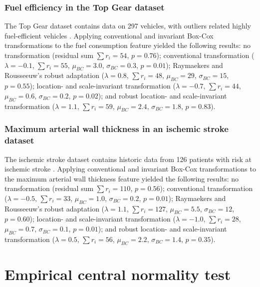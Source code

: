 \documentclass[preprint,12pt,authoryear]{elsarticle}
\begin{document}
\subsubsection{Fuel efficiency in the Top Gear
dataset}\label{sec-app:fuel-efficiency-in-the-top-gear-dataset}

The Top Gear dataset contains data on 297 vehicles, with outliers
related highly fuel-efficient vehicles \citep{Alfons2021-kc}. Applying
conventional and invariant Box-Cox transformations to the fuel
consumption feature yielded the following results: no transformation
(residual sum \(\sum r_i = 54\), \(p=0.76\)); conventional
transformation (\(\lambda = -0.1\), \(\sum r_i = 55\),
\(\mu_{BC} = 3.0\), \(\sigma_{BC} = 0.3\), \(p=0.01\)); Raymaekers and
Rousseeuw's robust adaptation (\(\lambda = 0.8\), \(\sum r_i = 48\),
\(\mu_{BC} = 29\), \(\sigma_{BC} = 15\), \(p=0.55\)); location- and
scale-invariant transformation (\(\lambda = -0.7\), \(\sum r_i = 44\),
\(\mu_{BC} = 0.6\), \(\sigma_{BC} = 0.2\), \(p=0.02\)); and robust
location- and scale-invariant transformation (\(\lambda = 1.1\),
\(\sum r_i = 59\), \(\mu_{BC} = 2.4\), \(\sigma_{BC} = 1.8\),
\(p=0.83\)).

\subsubsection{Maximum arterial wall thickness in an ischemic stroke
dataset}\label{sec-app:maximum-arterial-wall-thickness-in-an-ischemic-stroke-dataset}

The ischemic stroke dataset contains historic data from 126 patients
with risk at ischemic stroke \citep{Kuhn2019-kt}. Applying
conventional and invariant Box-Cox transformations to the maximum
arterial wall thickness feature yielded the following results: no
transformation (residual sum \(\sum r_i = 110\), \(p=0.56\));
conventional transformation (\(\lambda = -0.5\), \(\sum r_i = 33\),
\(\mu_{BC} = 1.0\), \(\sigma_{BC} = 0.2\), \(p=0.01\)); Raymaekers and
Rousseeuw's robust adaptation (\(\lambda = 1.1\), \(\sum r_i = 127\),
\(\mu_{BC} = 5.5\), \(\sigma_{BC} = 12\), \(p=0.60\)); location- and
scale-invariant transformation (\(\lambda = -1.0\), \(\sum r_i = 28\),
\(\mu_{BC} = 0.7\), \(\sigma_{BC} = 0.1\), \(p=0.01\)); and robust
location- and scale-invariant transformation (\(\lambda = 0.5\),
\(\sum r_i = 56\), \(\mu_{BC} = 2.2\), \(\sigma_{BC} = 1.4\),
\(p=0.35\)).

\section{Empirical central normality test}\label{appendix-e-empirical-central-normality-test}
\end{document}
